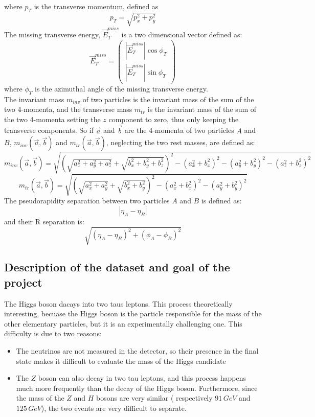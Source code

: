 \documentclass[12pt]{article}
\begin{document}
where $p_T$ is the transverse momentum, defined as
\begin{equation}
  p_T = \sqrt{p_x^2 + p_y^2}
\end{equation}
The missing transverse energy, $\vec{E}^{miss}_{T}$ is a two dimensional vector defined as:
\begin{equation}
  \vec{E}^{miss}_{T} = \begin{pmatrix}
	|\vec{E}^{miss}_{T}| \cos\phi_T \\
	|\vec{E}^{miss}_{T}| \sin\phi_T
  \end{pmatrix}
\end{equation}
where $\phi_T$ is the azimuthal angle of the missing transverse energy. \\
The invariant mass $m_{inv}$ of two particles is the invariant mass of the sum of the two 4-momenta, and 
the transverse mass $m_{tr}$ is the invariant mass of the sum of the two 4-momenta setting the $z$ component 
to zero, thus only keeping the transverse components.
So if $\vec{a}$ and $\vec{b}$ are the 4-momenta of two particles $A$ and $B$, $m_{inv}(\vec{a},\vec{b})$ 
and $m_{tr}(\vec{a},\vec{b})$, neglecting the two rest masses, are defined as:
\begin{equation}
  m_{inv}(\vec{a},\vec{b}) = \sqrt{\left(\sqrt{a_x^2 + a_y^2 + a_z^2} + \sqrt{b_x^2 + b_y^2 + b_z^2}\right)^2 
  - (a_x^2 + b_x^2)^2 - (a_y^2 + b_y^2)^2 - (a_z^2 + b_z^2)^2}
\end{equation}
\begin{equation}
  m_{tr}(\vec{a},\vec{b}) = \sqrt{\left(\sqrt{a_x^2 + a_y^2} + \sqrt{b_x^2 + b_y^2}\right)^2 
  - (a_x^2 + b_x^2)^2 - (a_y^2 + b_y^2)^2}
\end{equation}
The pseudorapidity separation between two particles $A$ and $B$ is defined as:
\begin{equation}
  |\eta_A - \eta_B|
\end{equation}
and their R separation is:
\begin{equation}
  \sqrt{(\eta_A - \eta_B)^2 + (\phi_A - \phi_B)^2}
\end{equation}

\subsection{Description of the dataset and goal of the project}
The Higgs boson dacays into two taus leptons. This process theoretically interesting, becuase the Higgs 
boson is the particle responsible for the mass of the other elementary particles, but it is an experimentally 
challenging one. This difficulty is due to two reasons:
\begin{itemize}
  \item The neutrinos are not measured in the detector, so their presence in the final state makes it 
	difficult to evaluate the mass of the Higgs candidate
  \item The $Z$ boson can also decay in two tau leptons, and this process happens much more frequently than 
	the decay of the Higgs boson. Furthermore, since the mass of the $Z$ and $H$ bosons are very similar (
	respectively $91\,GeV$ and $125\,GeV$), the two events are very difficult to separate.
\end{itemize}
\end{document}
